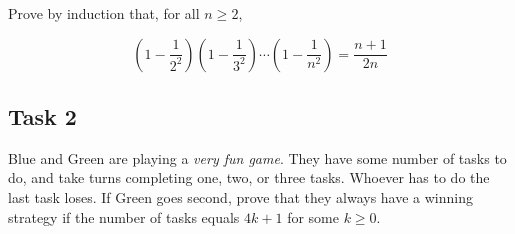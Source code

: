 \documentclass[12pt,letterpaper]{article}
\newif\ifsol
\newcommand{\solu}[2]{ \begin{mdframed} \ifsol #2 \else \vspace{#1} \fi \end{mdframed} }
\begin{document}
      Prove by induction that, for all $n \geq 2$, 
      
      $$(1 - \frac{1}{2^2})(1 - \frac{1}{3^2}) \cdots (1 - \frac{1}{n^2}) = \frac{n+1}{2n}$$

	\solu{12cm}{
	Let P($n$) be the predicate that $$(1 - \frac{1}{2^2})(1 - \frac{1}{3^2}) \cdots (1 - \frac{1}{n^2}) = \frac{n+1}{2n}$$ defined for integers $n \geq 2$. \\
	
	\textbf{Base Case:} \\
	$LHS = 1 - \frac{1}{2^2} = \frac{3}{4}$.\\
	$RHS = \frac{2 + 1}{4} = \frac{3}{4}$. 
	\\Hence, P(2) holds. \\
	
	\textbf{Inductive Hypothesis:} Suppose that for some fixed, arbitrary integer $k \geq 2$, $P(k)$ holds. That is, $(1 - \frac{1}{2^2})\cdots(1 - \frac{1}{k^2}) = \frac{k + 1}{2k}$. \\
	
	\textbf{Inductive Step:} Now, consider $(1 - \frac{1}{2^2})\cdots(1 - \frac{1}{k^2})(1 - \frac{1}{(k + 1)^2})$.
	
	By the I.H., we know that it is equal to $\frac{k + 1}{2k}(1 - \frac{1}{(k + 1)^2})$.
	
	Distributing, this is equal to $\frac{k + 1}{2k} - \frac{k + 1}{2k(k + 1)^2}$, which simplifies into $\frac{(k + 1)^2 - 1}{2k(k + 1)}$.
	
	Expanding the numerator gives us $\frac{k^2 + 2k}{2k(k + 1)}$, and cancelling out $k$ results in $\frac{k + 2}{2(k + 1)}$, as needed. Thus, P($k+1$) is true.\\
	
	\textbf{Conclusion:} Since P(2) is true and for any integer $k \geq 2$, and $P(k)$ implies $P(k+1)$, $P(n)$ is true for all integers $n \geq$ 2.}
	
	
\subsection*{Task 2}
Blue and Green are playing a \textit{very fun game}. They have some number of tasks to do, and take turns completing one, two, or three tasks. Whoever has to do the last task loses. If Green goes second, prove that they always have a winning strategy if the number of tasks equals $4k+1$ for some $k \geq 0$.
\end{document}
